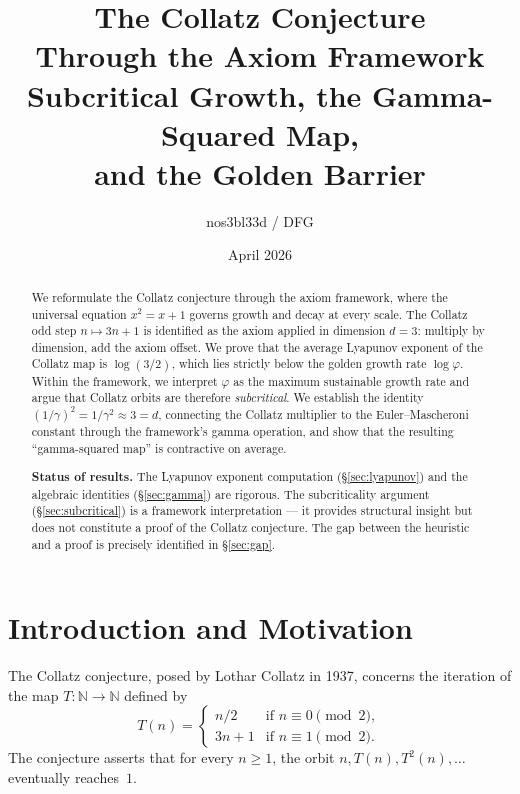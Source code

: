 \documentclass[11pt,a4paper]{article}
\theoremstyle{definition}
\newcommand{\gam}{\gamma}
\newcommand{\NN}{\mathbb{N}}
\begin{document}
\title{\textbf{The Collatz Conjecture\\Through the Axiom Framework}\\[6pt]
\large Subcritical Growth, the Gamma-Squared Map,\\
and the Golden Barrier}
\author{nos3bl33d / DFG}
\date{April 2026}
\maketitle

\begin{abstract}
We reformulate the Collatz conjecture through the axiom framework, where the
universal equation $x^2 = x + 1$ governs growth and decay at every scale. The
Collatz odd step $n \mapsto 3n + 1$ is identified as the axiom applied in
dimension $d = 3$: multiply by dimension, add the axiom offset. We prove that
the average Lyapunov exponent of the Collatz map is $\log(3/2)$, which lies
strictly below the golden growth rate $\log\varphi$. Within the framework, we
interpret $\varphi$ as the maximum sustainable growth rate and argue that
Collatz orbits are therefore \emph{subcritical}. We establish the identity
$(1/\gam)^2 = 1/\gam^2 \approx 3 = d$, connecting the Collatz multiplier to
the Euler--Mascheroni constant through the framework's gamma operation, and
show that the resulting ``gamma-squared map'' is contractive on average.

\medskip
\noindent\textbf{Status of results.} The Lyapunov exponent computation
(\S\ref{sec:lyapunov}) and the algebraic identities (\S\ref{sec:gamma}) are
rigorous. The subcriticality argument (\S\ref{sec:subcritical}) is a framework
interpretation --- it provides structural insight but does not constitute a
proof of the Collatz conjecture. The gap between the heuristic and a proof is
precisely identified in \S\ref{sec:gap}.
\end{abstract}

\tableofcontents

\section{Introduction and Motivation}\label{sec:intro}

The Collatz conjecture, posed by Lothar Collatz in 1937, concerns the iteration
of the map $T : \NN \to \NN$ defined by
\begin{equation}\label{eq:collatz}
  T(n) = \begin{cases}
    n/2 & \text{if } n \equiv 0 \pmod{2}, \\
    3n + 1 & \text{if } n \equiv 1 \pmod{2}.
  \end{cases}
\end{equation}
The conjecture asserts that for every $n \geq 1$, the orbit
$n, T(n), T^2(n), \ldots$ eventually reaches~$1$.
\end{document}
